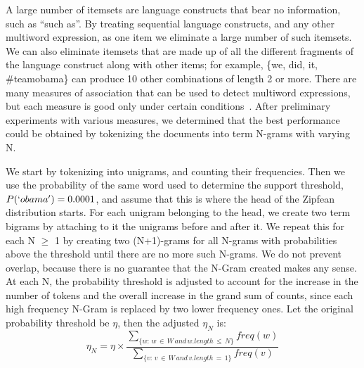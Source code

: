 \documentclass{sig-alternate}
\begin{document}
A large number of itemsets are language constructs that bear no information,
such as ``such as''. 
By treating sequential language constructs, and any other multiword expression,
as one item we eliminate a large number of such itemsets.
We can also eliminate itemsets that are made up of all the different fragments
of the language construct along with other items;
for example, \{we, did, it, \#teamobama\} can produce 10 other combinations of
length 2 or more.
There are many measures of association that can be used to detect multiword
expressions, but each measure is good only under certain conditions~\cite{ramisch2012broad,tan2002selecting}.
After preliminary experiments with various measures, we determined that
the best performance
could be obtained by tokenizing the documents into term N-grams with varying N. 

We start by tokenizing into unigrams, and counting their frequencies.
Then we use the probability of the same word used to determine the support
threshold, $P(`obama') = 0.0001$, and assume that this is where the head of
the Zipfean distribution starts.
For each unigram belonging to the head, we create two term bigrams by
attaching to it the unigrams before and after it.
We repeat this for each N $\ge$ 1 by creating two (N+1)-grams for all N-grams
with probabilities above the threshold until there are no more such N-grams.
We do not prevent overlap, because there is no guarantee that the N-Gram
created makes any sense.
At each N, the probability threshold is adjusted to account for the increase
in the number of tokens and the overall increase in the grand sum of counts,
since each high frequency N-Gram is replaced by two lower frequency ones.
Let the original probability threshold be $\eta$, then the adjusted $\eta_N$
is:
\begin{equation}\eta_N = \eta \times \frac{\sum_{\{w:\, w \,\in\, W\, and\, w.length \,\le\, N\}}{freq(w)}}{\sum_{\{v:\, v\, \in\, W \,and \,v.length\,=\,1\}}{freq(v)}}\end{equation}
\end{document}
